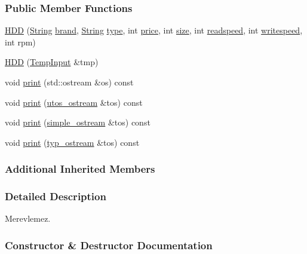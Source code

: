 \subsubsection*{Public Member Functions}
\begin{DoxyCompactItemize}
\item 
\mbox{\hyperlink{class_h_d_d_a375ad923cb64a11afc261fe1fac5276c}{H\+DD}} (\mbox{\hyperlink{class_string}{String}} \mbox{\hyperlink{class_part_ae06f2fdeb7fbbdb229a7aca151f3e341}{brand}}, \mbox{\hyperlink{class_string}{String}} \mbox{\hyperlink{class_part_a101dbcc5c4b21564df7414c7eb0eae88}{type}}, int \mbox{\hyperlink{class_part_a8e71223aed1da95a974f33d8d6c91bb1}{price}}, int \mbox{\hyperlink{class_storage_abcc80ce58a21fa884035617ee0b6cb67}{size}}, int \mbox{\hyperlink{class_storage_a41073842ff16961dad3903e6dd49bb0c}{readspeed}}, int \mbox{\hyperlink{class_storage_a0198a1483ccf849d48c76da88599ba8b}{writespeed}}, int rpm)
\item 
\mbox{\hyperlink{class_h_d_d_a74adfdcd9b7e7e1e463f6e5c442c78e0}{H\+DD}} (\mbox{\hyperlink{struct_temp_input}{Temp\+Input}} \&tmp)
\item 
void \mbox{\hyperlink{class_h_d_d_a07c34356018542934a4dd91ce38b0821}{print}} (std\+::ostream \&os) const
\item 
void \mbox{\hyperlink{class_h_d_d_aca2c2583fa3304917905cd9185b64539}{print}} (\mbox{\hyperlink{structutos__ostream}{utos\+\_\+ostream}} \&tos) const
\item 
void \mbox{\hyperlink{class_h_d_d_a0e48767713740f3ec7dafd907d3570b1}{print}} (\mbox{\hyperlink{structsimple__ostream}{simple\+\_\+ostream}} \&tos) const
\item 
void \mbox{\hyperlink{class_h_d_d_a557271f835f56a25fe5c264019f20bb2}{print}} (\mbox{\hyperlink{structtyp__ostream}{typ\+\_\+ostream}} \&tos) const
\end{DoxyCompactItemize}
\subsubsection*{Additional Inherited Members}


\subsubsection{Detailed Description}
Merevlemez. 

\subsubsection{Constructor \& Destructor Documentation}
\mbox{\label{class_h_d_d_a375ad923cb64a11afc261fe1fac5276c}} 
